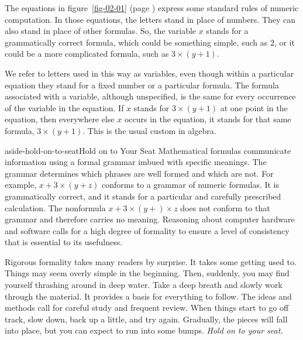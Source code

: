 The equations in figure~\ref{fig-02-01} (page \pageref{fig-02-01})
express some standard rules of numeric computation.
In those equations, the letters stand in
place of numbers. They can also stand in place of other
formulas.
So, the variable $x$ stands for a grammatically correct formula,
which could be something simple, such as $2$, or
it could be a more complicated formula, such as $3 \times (y + 1)$.

We refer to letters used in this way as
variables, even though within a particular equation they
stand for a fixed number or a particular formula.
The formula associated with a variable, although unspecified,
is the same for every occurrence of the variable in the equation.
If $x$ stands for $3\times(y + 1)$ at one point in the
equation, then everywhere else $x$ occurs in the equation,
it stands for that same formula, $3\times(y + 1)$.
This is the usual custom in algebra.

\begin{aside}{aside-hold-on-to-seat}{Hold on to Your Seat}
Mathematical formulas communicate
information using a formal grammar imbued with specific meanings.
The grammar determines which phrases are well formed
and which are not.
For example, $x+3\times(y + z)$ conforms to a grammar
of numeric formulas.
It is grammatically correct, and it stands for a
particular and carefully prescribed calculation.
The nonformula $x+3 \times (y + ) \times z$
does not conform to that grammar and therefore
carries no meaning.
Reasoning about computer hardware and software
calls for a high degree of formality to ensure
a level of consistency that is essential to  its usefulness.

Rigorous formality takes many readers by surprise.
It takes some getting used to.
Things may seem overly simple in the beginning.
Then, suddenly, you may find yourself thrashing around in deep water.
Take a deep breath and slowly work  through the material.
It provides a basis for everything to follow.
The ideas and methods call for careful study and frequent review.
When things start to go off track,
slow down, back up a little, and try
again.
Gradually, the pieces will fall into place,
but you can expect to run into some bumps.
\emph{Hold on to your seat.}
\end{aside}

